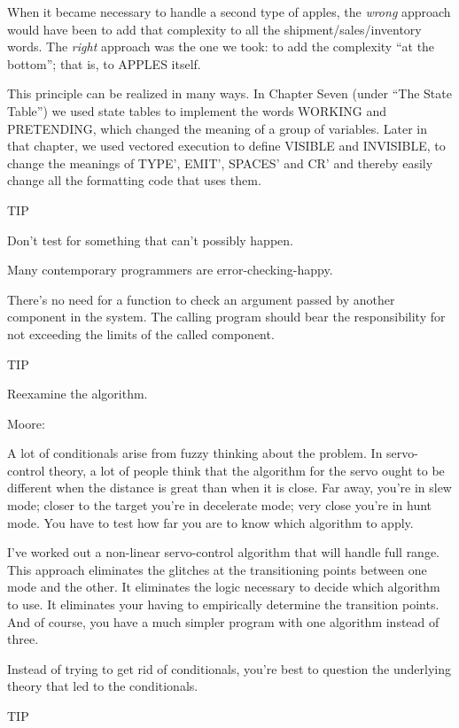 When it became necessary to handle a second type of apples, the
\emph{wrong} approach would have been to add that complexity to all the
shipment/sales/inventory words. The \emph{right} approach was the one we
took: to add the complexity ``at the bottom''; that is, to APPLES itself.

This principle can be realized in many ways. In Chapter Seven
(under ``The State Table'') we used state tables to implement the words
WORKING and PRETENDING, which changed the meaning of a group
of variables. Later in that chapter, we used vectored execution to define
VISIBLE and INVISIBLE, to change the meanings of TYPE', EMIT',
SPACES' and CR' and thereby easily change all the formatting code that
uses them.

TIP

Don't test for something that can't possibly happen.

Many contemporary programmers are error-checking-happy.

There's no need for a function to check an argument passed by
another component in the system. The calling program should bear the
responsibility for not exceeding the limits of the called component.

TIP

Reexamine the algorithm.

Moore:

A lot of conditionals arise from fuzzy thinking about the problem. In
servo-control theory, a lot of people think that the algorithm for the servo
ought to be different when the distance is great than when it is close. Far
away, you're in slew mode; closer to the target you're in decelerate mode;
very close you're in hunt mode. You have to test how far you are to know
which algorithm to apply.

I've worked out a non-linear servo-control algorithm that will handle full
range. This approach eliminates the glitches at the transitioning points
between one mode and the other. It eliminates the logic necessary to decide
which algorithm to use. It eliminates your having to empirically determine
the transition points. And of course, you have a much simpler program with
one algorithm instead of three.

Instead of trying to get rid of conditionals, you're best to question the
underlying theory that led to the conditionals.

TIP


